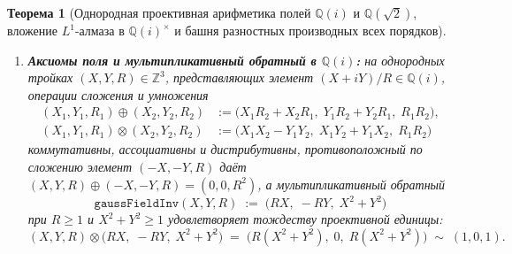 \documentclass[11pt,a4paper]{article}
\theoremstyle{plain}
\newtheorem{theorem}{Теорема}[section]
\theoremstyle{definition}
\begin{document}
\begin{theorem}[Однородная проективная арифметика полей $\mathbb{Q}(i)$ и $\mathbb{Q}(\sqrt{2})$, вложение $L^1$-алмаза в $\mathbb{Q}(i)^\times$ и башня разностных производных всех порядков]
\begin{enumerate}[label=\textbf{(\roman*)},leftmargin=*]
\item \textbf{Аксиомы поля и мультипликативный обратный в $\mathbb{Q}(i)$:}
  на однородных тройках $(X, Y, R) \in \mathbb{Z}^3$, представляющих элемент $(X + iY)/R \in \mathbb{Q}(i)$, операции сложения и умножения
  \begin{align}
    (X_1, Y_1, R_1) \oplus (X_2, Y_2, R_2) &:= \bigl(X_1 R_2 + X_2 R_1,\; Y_1 R_2 + Y_2 R_1,\; R_1 R_2\bigr), \label{eq:gauss-field-add} \\
    (X_1, Y_1, R_1) \otimes (X_2, Y_2, R_2) &:= \bigl(X_1 X_2 - Y_1 Y_2,\; X_1 Y_2 + Y_1 X_2,\; R_1 R_2\bigr) \label{eq:gauss-field-mul}
  \end{align}
  коммутативны, ассоциативны и дистрибутивны, противоположный по сложению элемент $(-X, -Y, R)$ даёт $(X, Y, R) \oplus (-X, -Y, R) = (0, 0, R^2)$, а мультипликативный обратный
  \begin{equation}
    \label{eq:gauss-field-inv-def}
    \texttt{gaussFieldInv}(X, Y, R) \;:=\; \bigl(RX,\; -RY,\; X^2 + Y^2\bigr)
  \end{equation}
  при $R \ge 1$ и $X^2 + Y^2 \ge 1$ удовлетворяет тождеству проективной единицы:
  \begin{equation}
    \label{eq:gauss-field-inverse}
    (X, Y, R) \otimes \bigl(RX,\; -RY,\; X^2 + Y^2\bigr) \;=\; \bigl(R(X^2 + Y^2),\; 0,\; R(X^2 + Y^2)\bigr) \;\sim\; (1, 0, 1).
  \end{equation}


\end{enumerate}
\end{theorem}
\end{document}
